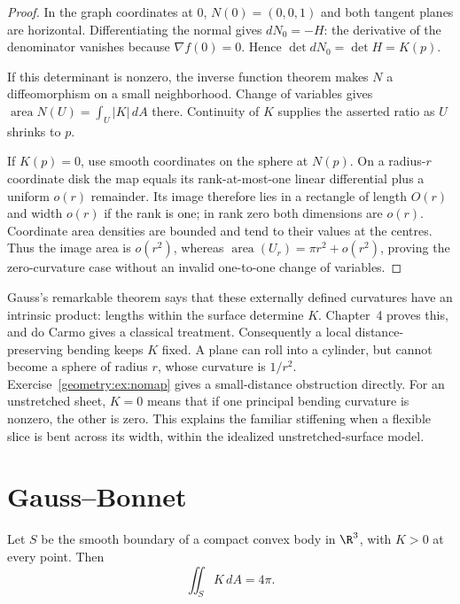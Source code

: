 \begin{proof}
In the graph coordinates at $0$, $N(0)=(0,0,1)$ and both tangent planes are horizontal. Differentiating the normal gives $dN_0=-H$: the derivative of the denominator vanishes because $\nabla f(0)=0$. Hence $\det dN_0=\det H=K(p)$.

If this determinant is nonzero, the inverse function theorem makes $N$ a diffeomorphism on a small neighborhood. Change of variables gives $\operatorname{area}N(U)=\int_U|K|\,dA$ there. Continuity of $K$ supplies the asserted ratio as $U$ shrinks to $p$.

If $K(p)=0$, use smooth coordinates on the sphere at $N(p)$. On a radius-$r$ coordinate disk the map equals its rank-at-most-one linear differential plus a uniform $o(r)$ remainder. Its image therefore lies in a rectangle of length $O(r)$ and width $o(r)$ if the rank is one; in rank zero both dimensions are $o(r)$. Coordinate area densities are bounded and tend to their values at the centres. Thus the image area is $o(r^2)$, whereas $\operatorname{area}(U_r)=\pi r^2+o(r^2)$, proving the zero-curvature case without an invalid one-to-one change of variables.
\end{proof}

\begin{remark}
Gauss's remarkable theorem says that these externally defined curvatures have an intrinsic product: lengths within the surface determine $K$. Chapter~4 proves this, and do Carmo gives a classical treatment. Consequently a local distance-preserving bending keeps $K$ fixed. A plane can roll into a cylinder, but cannot become a sphere of radius $r$, whose curvature is $1/r^2$. Exercise~\ref{geometry:ex:nomap} gives a small-distance obstruction directly. For an unstretched sheet, $K=0$ means that if one principal bending curvature is nonzero, the other is zero. This explains the familiar stiffening when a flexible slice is bent across its width, within the idealized unstretched-surface model.
\end{remark}

\section{Gauss--Bonnet}

\begin{theorem}\label{geometry:thm:gbconvex}
Let $S$ be the smooth boundary of a compact convex body in $\R^3$, with $K>0$ at every point. Then
\[
\iint_S K\,dA=4\pi.
\]
\end{theorem}

